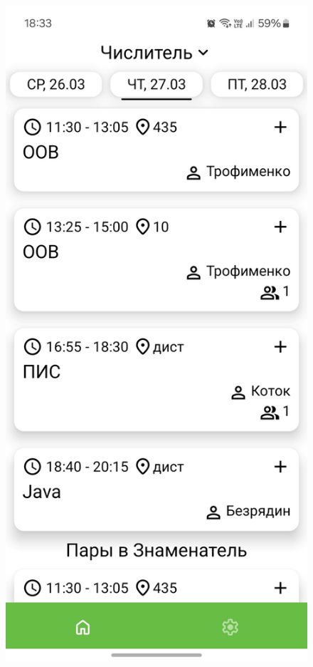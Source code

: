 \documentclass{vsureport}
\begin{document}
\begin{figure}[H]
    \centering
    \begin{minipage}{0.48\textwidth}
        \centering
        \includegraphics[width=\linewidth]{13.png}

\end{minipage}
\end{figure}
\end{document}
